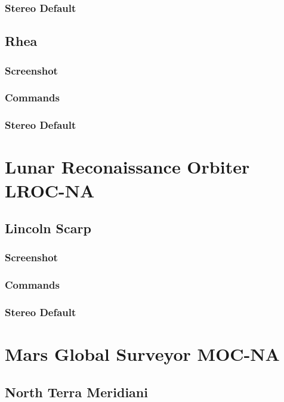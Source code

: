 \subsubsection*{Stereo Default}

\subsection{Rhea}

\subsubsection*{Screenshot}

\subsubsection*{Commands}

\subsubsection*{Stereo Default}

\section{Lunar Reconaissance Orbiter LROC-NA}

\subsection{Lincoln Scarp}

\subsubsection*{Screenshot}

\subsubsection*{Commands}

\subsubsection*{Stereo Default}

\section{Mars Global Surveyor MOC-NA}

\subsection{North Terra Meridiani}

